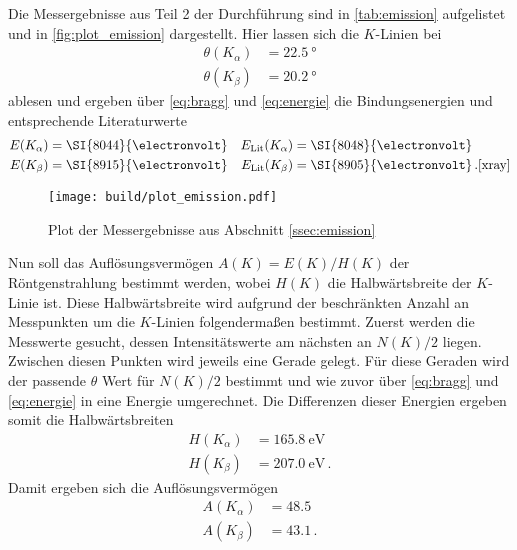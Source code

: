 Die Messergebnisse aus Teil 2 der Durchführung sind in \autoref{tab:emission} aufgelistet und in \autoref{fig:plot_emission} dargestellt.
Hier lassen sich die $K$-Linien bei
\begin{align*}
    \theta(K_\alpha) &= \SI{22.5}{\degree} \\
    \theta(K_\beta) &= \SI{20.2}{\degree}
\end{align*}
ablesen und ergeben über \autoref{eq:bragg} und \ref{eq:energie} die Bindungsenergien und entsprechende Literaturwerte
\begin{align*}
    E(K_\alpha) &= \SI{8044}{\electronvolt} & E_\text{Lit}(K_\alpha) &= \SI{8048}{\electronvolt} \\
    E(K_\beta) &= \SI{8915}{\electronvolt} & E_\text{Lit}(K_\beta) &= \SI{8905}{\electronvolt} \,.\text{\cite{xray}}
\end{align*}

\begin{figure}
    \centering
    \texttt{[image: build/plot\_emission.pdf]}
    \caption{Plot der Messergebnisse aus Abschnitt \ref{ssec:emission}}
    \label{fig:plot_emission}
\end{figure}

Nun soll das Auflösungsvermögen $A(K)=E(K)/H(K)$ der Röntgenstrahlung bestimmt werden, wobei $H(K)$ die Halbwärtsbreite der $K$-Linie ist.
Diese Halbwärtsbreite wird aufgrund der beschränkten Anzahl an Messpunkten um die $K$-Linien folgendermaßen bestimmt.
Zuerst werden die Messwerte gesucht, dessen Intensitätswerte am nächsten an $N(K)/2$ liegen.
Zwischen diesen Punkten wird jeweils eine Gerade gelegt.
Für diese Geraden wird der passende $\theta$ Wert für $N(K)/2$ bestimmt und wie zuvor über \autoref{eq:bragg} und \autoref{eq:energie} in eine Energie umgerechnet.
Die Differenzen dieser Energien ergeben somit die Halbwärtsbreiten
\begin{align*}
    H(K_\alpha) &= \SI{165.8}{\electronvolt} \\
    H(K_\beta) &= \SI{207.0}{\electronvolt} \,.
\end{align*}
Damit ergeben sich die Auflösungsvermögen
\begin{align*}
    A(K_\alpha) &= \num{48.5} \\
    A(K_\beta) &= \num{43.1} \,.
\end{align*}

